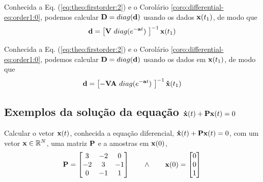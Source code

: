 \begin{corollary}
\label{coro:differential-eq:order1:1}
Conhecida a Eq. (\ref{eq:theo:firstorder:2}) e o Corolário \ref{coro:differential-eq:order1:0},
podemos calcular
$\MATRIX{D}=\funcdiag(\VECTOR{d})$ 
usando os dados $\VECTOR{x}(t_1)$, de modo que
\begin{equation}\label{eq:coro:differential-eq:order1:1:a}
\VECTOR{d} =
\left[ \MATRIX{V}~\funcdiag(e^{-\VECTOR{a}t})~ \right]^{-1}
\VECTOR{x}(t_1)
\end{equation}
\end{corollary}

\begin{corollary}
\label{coro:differential-eq:order1:2}
Conhecida a Eq. (\ref{eq:theo:firstorder:2}) e o Corolário \ref{coro:differential-eq:order1:0},
podemos calcular
$\MATRIX{D}=\funcdiag(\VECTOR{d})$ 
usando os dados em $\VECTOR{x}(t_1)$, de modo que
\begin{equation}\label{eq:coro:differential-eq:order1:1:b}
\VECTOR{d} =
\left[ -\MATRIX{V}\MATRIX{A}~\funcdiag(e^{-\VECTOR{a}t})~ \right]^{-1}
\DTVECTOR{x}(t_1)
\end{equation}
\end{corollary}

\subsection{Exemplos da solução da equação $\DTVECTOR{x}(t) + \MATRIX{P} \VECTOR{x}(t)=0$}

\begin{example}
\label{ex:dxPx:0}
Calcular o vetor $\VECTOR{x}(t)$,
conhecida a equação diferencial, $\DTVECTOR{x}(t) + \MATRIX{P} \VECTOR{x}(t)=0$, com 
um vetor $\VECTOR{x} \in \mathbb{R}^{N}$, uma matriz $\MATRIX{P}$ e a amostras em $\VECTOR{x}(0)$,
\begin{equation}
\MATRIX{P}=
\begin{bmatrix}
3 & -2 & 0\\
-2 & 3 & -1\\
0 & -1 & 1
\end{bmatrix}
\qquad \wedge \qquad
\VECTOR{x}(0)=
\begin{bmatrix}
0\\
0\\
1
\end{bmatrix}
\end{equation}
\end{example}



